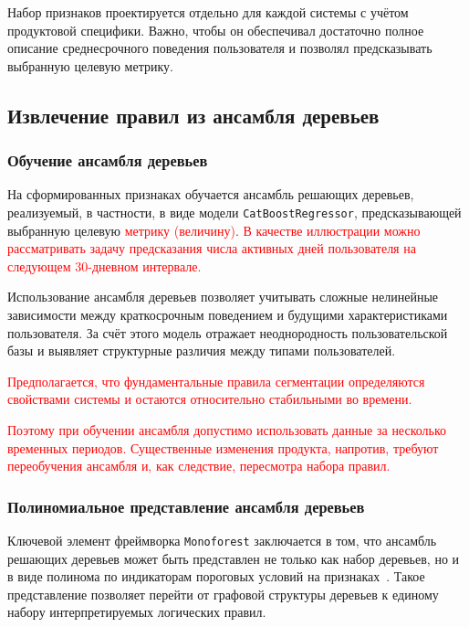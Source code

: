 Набор признаков проектируется отдельно для каждой системы с учётом
продуктовой специфики. Важно, чтобы он обеспечивал достаточно полное
описание среднесрочного поведения пользователя и позволял предсказывать
выбранную целевую метрику.

\subsection{Извлечение правил из ансамбля деревьев}
\label{subsec:rule_based_representation}

\subsubsection{Обучение ансамбля деревьев}
\label{subsubsec:model_training}

На сформированных признаках обучается ансамбль решающих деревьев,
реализуемый, в частности, в виде модели \texttt{CatBoostRegressor},
предсказывающей выбранную целевую \textcolor{red}{метрику (величину)}. \textcolor{red}{В качестве иллюстрации можно
рассматривать задачу предсказания числа активных дней пользователя на
следующем 30-дневном интервале.}

Использование ансамбля деревьев позволяет учитывать сложные
нелинейные зависимости между краткосрочным поведением и будущими
характеристиками пользователя. За счёт этого модель отражает
неоднородность пользовательской базы и выявляет структурные различия
между типами пользователей.

 \textcolor{red}{
Предполагается, что фундаментальные правила сегментации определяются
свойствами системы и остаются относительно стабильными во времени.}


\textcolor{red}{
Поэтому при обучении ансамбля допустимо использовать данные за
несколько временных периодов. Существенные изменения продукта, напротив,
требуют переобучения ансамбля и, как следствие, пересмотра набора правил.}


\subsubsection{Полиномиальное представление ансамбля деревьев}
\label{subsubsec:polynomial_representation}

Ключевой элемент фреймворка \texttt{Monoforest} заключается в том, что
ансамбль решающих деревьев может быть представлен не только как набор
деревьев, но и в виде полинома по индикаторам пороговых условий
на признаках~\cite{monoforest}. Такое представление позволяет перейти
от графовой структуры деревьев к единому набору интерпретируемых
логических правил.

